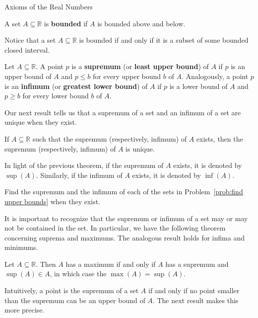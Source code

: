 \begin{section}{Axioms of the Real Numbers}
\begin{definition}
A set $A\subseteq \mathbb{R}$ is \textbf{bounded} if $A$ is bounded above and below.
\end{definition}

Notice that a set $A\subseteq\mathbb{R}$ is bounded if and only if it is a subset of some bounded closed interval.

\begin{definition}
Let $A\subseteq \mathbb{R}$. A point $p$ is a \textbf{supremum} (or \textbf{least upper bound}) of $A$ if $p$ is an upper bound of $A$ and $p\leq b$ for every upper bound $b$ of $A$.  Analogously, a point $p$ is an \textbf{infimum} (or \textbf{greatest lower bound}) of $A$ if $p$ is a lower bound of $A$ and $p\geq b$ for every lower bound $b$ of $A$. 
\end{definition}

Our next result tells us that a supremum of a set and an infimum of a set are unique when they exist.

\begin{theorem}
If $A\subseteq \mathbb{R}$ such that the supremum (respectively, infimum) of $A$ exists, then the supremum (respectively, infimum) of $A$ is unique.
\end{theorem}

In light of the previous theorem, if the supremum of $A$ exists, it is denoted by $\boxed{\sup(A)}$. Similarly, if the infimum of $A$ exists, it is denoted by $\boxed{\inf(A)}$. 

\begin{problem}
Find the supremum and the infimum of each of the sets in Problem~\ref{prob:find upper bounds} when they exist.
\end{problem}

It is important to recognize that the supremum or infimum of a set may or may not be contained in the set. In particular, we have the following theorem concerning suprema and maximums. The analogous result holds for infima and minimums.

\begin{theorem}
Let $A\subseteq \mathbb{R}$. Then $A$ has a maximum if and only if $A$ has a supremum and $\sup(A)\in A$, in which case the $\max(A)=\sup(A)$.
\end{theorem}

Intuitively, a point is the supremum of a set $A$ if and only if no point smaller than the supremum can be an upper bound of $A$. The next result makes this more precise.


\end{section}
